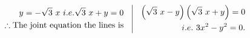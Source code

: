 \documentclass[17pt]{extarticle}
\begin{document}
\begin{fleqn}
\begin{equation} \nonumber
\begin{alignedat}{4}
y= -\sqrt{3}\ x \ i.e. \sqrt{3}\ x + y = 0 \\
\therefore \text {The joint equation the lines is}\\
\end{alignedat}
\quad
\vrule
\quad
\begin{alignedat}{4}
\left( \sqrt{3}\ x - y\right) \left( \sqrt{3}\ x + y\right) = 0 \\
i.e.\  3x^2 - y^2 = 0.
\end{alignedat}
\end{equation}


\end{fleqn}
\end{document}

